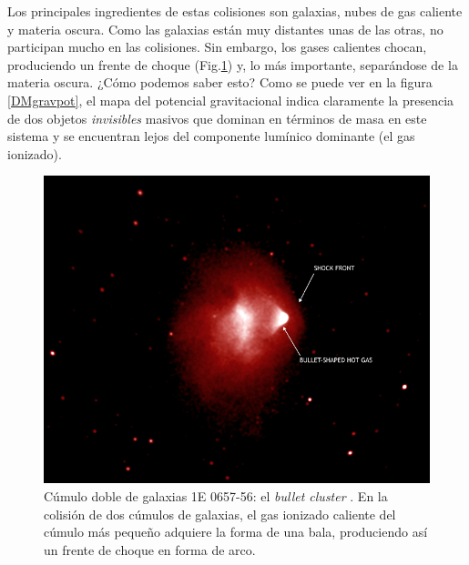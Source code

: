 \begin{itemize}
Los principales ingredientes de estas colisiones son galaxias, nubes de gas caliente y materia oscura. Como las galaxias están muy distantes unas de las otras, no participan mucho en las colisiones. Sin embargo, los gases calientes chocan, produciendo un frente de choque (Fig.\ref{bulletcluster}) y, lo más importante, separándose de la materia oscura. ¿Cómo podemos saber esto? Como se puede ver en la figura \ref{DMgravpot}, el mapa del potencial gravitacional indica claramente la presencia de dos objetos \textit{invisibles} masivos que dominan en términos de masa en este sistema y se encuentran lejos del componente lumínico dominante (el gas ionizado).



\begin{figure}[h]
\centering
  \includegraphics[width=.75\linewidth]{Images/bulletcluster.jpg}
  \caption[Cúmulo doble de galaxias 1E 0657-56: Bullet cluster]{Cúmulo doble de galaxias 1E 0657-56: el \textit{bullet cluster} \cite{clowe2006direct}. En la colisión de dos cúmulos de galaxias, el gas ionizado caliente del cúmulo más pequeño adquiere la forma de una bala, produciendo así un frente de choque en forma de arco.}
  \label{bulletcluster}
\end{figure}



\end{itemize}
